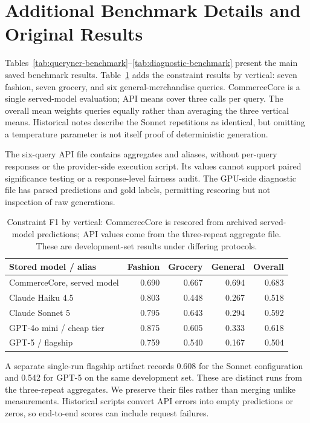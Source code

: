 \section{Additional Benchmark Details and Original Results}
\label{app:baselines}
Tables~\ref{tab:queryner-benchmark}--\ref{tab:diagnostic-benchmark} present the main saved benchmark results. Table~\ref{tab:vertical-benchmark} adds the constraint results by vertical: seven fashion, seven grocery, and six general-merchandise queries. CommerceCore is a single served-model evaluation; API means cover three calls per query. The overall mean weights queries equally rather than averaging the three vertical means. Historical notes describe the Sonnet repetitions as identical, but omitting a temperature parameter is not itself proof of deterministic generation.

The six-query API file contains aggregates and aliases, without per-query responses or the provider-side execution script. Its values cannot support paired significance testing or a response-level fairness audit. The GPU-side diagnostic file has parsed predictions and gold labels, permitting rescoring but not inspection of raw generations.

\begin{table}[h]
\centering
\caption{Constraint F1 by vertical: CommerceCore is rescored from archived served-model predictions; API values come from the three-repeat aggregate file. These are development-set results under differing protocols.}
\label{tab:vertical-benchmark}
\begin{tabular}{lrrrr}
\toprule
Stored model / alias & Fashion & Grocery & General & Overall \\
\midrule
CommerceCore, served model & 0.690 & 0.667 & 0.694 & 0.683 \\
\midrule
Claude Haiku 4.5 & 0.803 & 0.448 & 0.267 & 0.518 \\
Claude Sonnet 5 & 0.795 & 0.643 & 0.294 & 0.592 \\
GPT-4o mini / cheap tier & 0.875 & 0.605 & 0.333 & 0.618 \\
GPT-5 / flagship & 0.759 & 0.540 & 0.167 & 0.504 \\
\bottomrule
\end{tabular}
\end{table}

A separate single-run flagship artifact records 0.608 for the Sonnet configuration and 0.542 for GPT-5 on the same development set. These are distinct runs from the three-repeat aggregates. We preserve their files rather than merging unlike measurements. Historical scripts convert API errors into empty predictions or zeros, so end-to-end scores can include request failures.

